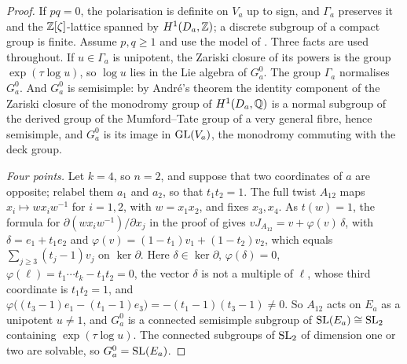 \begin{proof}
If $pq=0$, the polarisation is definite on $V_{a}$ up to sign, and
$\Gamma_{a}$ preserves it and the $\mathbb{Z}[\zeta]$-lattice spanned by
$H^{1}(D_{a},\mathbb{Z})$; a discrete subgroup of a compact group is finite. Assume
$p,q\ge1$ and use the model of . Three facts are used
throughout. If $u\in\Gamma_{a}$ is unipotent, the Zariski closure of its
powers is the group $\exp(\tau\log u)$, so $\log u$ lies in the Lie algebra
of $G_{a}^{0}$. The group $\Gamma_{a}$ normalises $G_{a}^{0}$. And $G_{a}^{0}$
is semisimple: by Andr\'e's theorem \cite[Theorem~1]{And92} the identity
component of the Zariski closure of the monodromy group of
$H^{1}(D_{a},\mathbb{Q})$ is a normal subgroup of the derived group of the
Mumford--Tate group of a very general fibre, hence semisimple, and
$G_{a}^{0}$ is its image in $\operatorname{GL}(V_{a})$, the monodromy commuting with the
deck group.

\emph{Four points.} Let $k=4$, so $n=2$, and suppose that two coordinates
of $a$ are opposite; relabel them $a_{1}$ and $a_{2}$, so that $t_{1}t_{2}=1$.
The full twist $A_{12}$ maps $x_{i}\mapsto wx_{i}w^{-1}$ for $i=1,2$, with
$w=x_{1}x_{2}$, and fixes $x_{3},x_{4}$. As $t(w)=1$, the formula for
$\partial(wx_{i}w^{-1})/\partial x_{j}$ in the proof of 
gives $vJ_{A_{12}}=v+\varphi(v)\,\delta$, with $\delta=e_{1}+t_{1}e_{2}$ and
$\varphi(v)=(1-t_{1})v_{1}+(1-t_{2})v_{2}$, which equals
$\sum_{j\ge3}(t_{j}-1)v_{j}$ on $\ker\partial$. Here $\delta\in\ker\partial$,
$\varphi(\delta)=0$, $\varphi(\ell)=t_{1}\cdots t_{k}-t_{1}t_{2}=0$, the
vector $\delta$ is not a multiple of $\ell$, whose third coordinate is
$t_{1}t_{2}=1$, and $\varphi\bigl((t_{3}-1)e_{1}-(t_{1}-1)e_{3}\bigr)
=-(t_{1}-1)(t_{3}-1)\ne0$. So $A_{12}$ acts on $E_{a}$ as a unipotent
$u\ne1$, and $G_{a}^{0}$ is a connected semisimple subgroup of
$\operatorname{SL}(E_{a})\cong\operatorname{SL}_{2}$ containing $\exp(\tau\log u)$. The connected
subgroups of $\operatorname{SL}_{2}$ of dimension one or two are solvable, so
$G_{a}^{0}=\operatorname{SL}(E_{a})$.


\end{proof}
